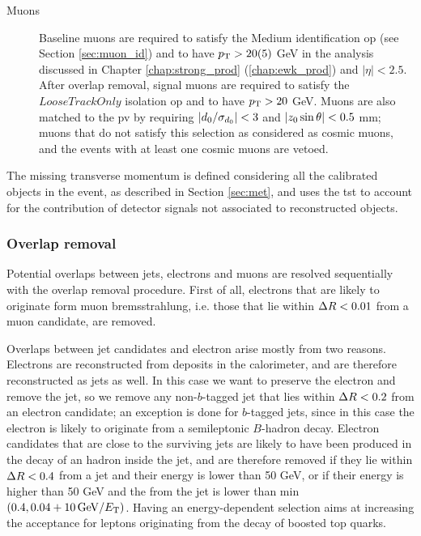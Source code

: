 \begin{description}
\item[Muons] Baseline muons are required to satisfy the Medium identification \gls{op} (see Section \ref{sec:muon_id}) and to have $p_{\rm T} > 20 (5)$ GeV in the analysis discussed in Chapter \ref{chap:strong_prod} (\ref{chap:ewk_prod}) and $|\eta|<2.5$. 
After overlap removal, signal muons are required to satisfy the $LooseTrackOnly$ isolation \gls{op} and to have $p_{\rm T} > 20$ GeV.
Muons are also matched to the \gls{pv} by requiring $|{d_0}/\sigma_{d_0}| < 3$ and  $|{z_0} \sin\theta| < 0.5$ mm; muons that do not satisfy this selection as considered as cosmic muons, and the events with at least one cosmic muons are vetoed.

\end{description}

The missing transverse momentum is defined considering all the calibrated objects in the event, as described in Section \ref{sec:met}, and uses the \gls{tst} to account for the contribution of
detector signals not associated to reconstructed objects. 

\subsubsection*{Overlap removal}

Potential overlaps between jets, electrons and muons are resolved sequentially with the overlap removal procedure. 
First of all, electrons that are likely to originate form muon bremsstrahlung, i.e. those that lie within $\Delta R < 0.01$ from a muon candidate, are removed.

Overlaps between jet candidates and electron arise mostly from two reasons. Electrons are reconstructed from deposits in the calorimeter, and are therefore reconstructed as jets as well.
In this case we want to preserve the electron and remove the jet, so we remove any non-$b$-tagged jet that lies within $\Delta R < 0.2$ from an electron candidate;
an exception is done for $b$-tagged jets, since in this case the electron is likely to originate from a semileptonic $B$-hadron decay. 
Electron candidates that are close to the surviving jets are likely to have been produced in the decay of an hadron inside the jet, and are therefore removed
if they lie within $\Delta R<0.4$ from a jet and their energy is lower than 50 GeV, or if their energy is higher than 50 GeV and the \dR from the jet 
is lower than min$(0.4, 0.04 + 10 \, {\rm{GeV}}/E_{\rm{T}})$. 
Having an energy-dependent \dR selection aims at increasing the acceptance for leptons originating from the decay of boosted top quarks.

